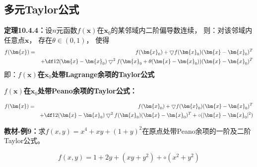 \subsection{多元Taylor公式}

{\bf 定理10.4.4：}设$n$元函数$f(\bm{x})$在$\bm{x}_0$的某邻域内二阶偏导数连续， 
则：对该邻域内任意点$\bm{x}$， 存在$\theta\in(0,1)$， 使得
\begin{eqnarray*}
	f(\bm{x}) & = & f(\bm{x}_0)+\bigtriangledown f(\bm{x}_0)(\bm{x}-\bm{x}_0)^T\\
	& & + \df 12(\bm{x}-\bm{x}_0)\bigtriangledown^2
	f(\bm{x}_0+\theta(\bm{x}-\bm{x}_0))(\bm{x}-\bm{x}_0)^T
\end{eqnarray*} 
即：{\bf $f(\bm{x})$在$\bm{x}_0$处带Lagrange余项的Taylor公式}

{\bf $f(\bm{x})$在$\bm{x}_0$处带Peano余项的Taylor公式：}

\begin{eqnarray*}
	f(\bm{x}) & = & f(\bm{x}_0)+\bigtriangledown f(\bm{x}_0)(\bm{x}-\bm{x}_0)^T\\
	& & + \df 12(\bm{x}-\bm{x}_0)\bigtriangledown^2
	f(\bm{x}_0)(\bm{x}-\bm{x}_0)^T+\circ(|\bm{x}-\bm{x}_0|^2)
\end{eqnarray*}

{\bf 教材-例9：}求$f(x,y)=x^4+xy+(1+y)^2$在原点处带Peano余项的一阶及二阶Taylor公式。

$$f(x,y)=1+2y+(xy+y^2)+\circ(x^2+y^2)$$

